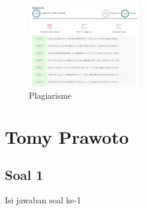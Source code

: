 \begin{enumerate}
   \begin{figure}[H]
	\includegraphics[width=5cm]{figures/4/1144124/Chapter4/Plagiarisme.jpg}
	\centering
    \caption{Plagiarisme}
    \label{Plagiarisme}
    \end{figure}
 \end{enumerate}

\section{Tomy Prawoto}
\subsection{Soal 1}
Isi jawaban soal ke-1

